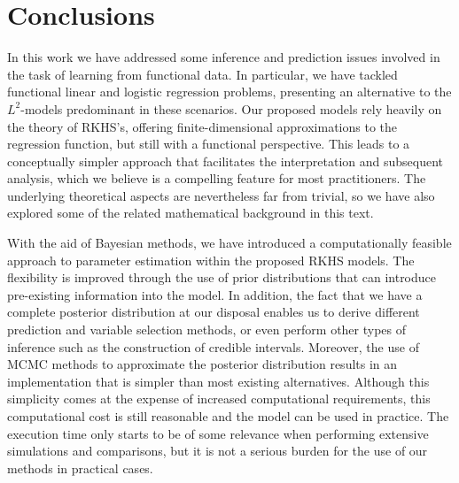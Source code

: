 %
%

\chapter{Conclusions}\label{ch:conclusions}

In this work we have addressed some inference and prediction issues involved in the task of learning from functional data. In particular, we have tackled functional linear and logistic regression problems, presenting an alternative to the \(L^2\)-models predominant in these scenarios. Our proposed models rely heavily on the theory of RKHS's, offering finite-dimensional approximations to the regression function, but still with a functional perspective. This leads to a conceptually simpler approach that facilitates the interpretation and subsequent analysis, which we believe is a compelling feature for most practitioners. The underlying theoretical aspects are nevertheless far from trivial, so we have also explored some of the related mathematical background in this text.

With the aid of Bayesian methods, we have introduced a computationally feasible approach to parameter estimation within the proposed RKHS models. The flexibility is improved through the use of prior distributions that can introduce pre-existing information into the model. In addition, the fact that we have a complete posterior distribution at our disposal enables us to derive different prediction and variable selection methods, or even perform other types of inference such as the construction of credible intervals. Moreover, the use of MCMC methods to approximate the posterior distribution results in an implementation that is simpler than most existing alternatives. Although this simplicity comes at the expense of increased computational requirements, this computational cost is still reasonable and the model can be used in practice. The execution time only starts to be of some relevance when performing extensive simulations and comparisons, but it is not a serious burden for the use of our methods in practical cases.


